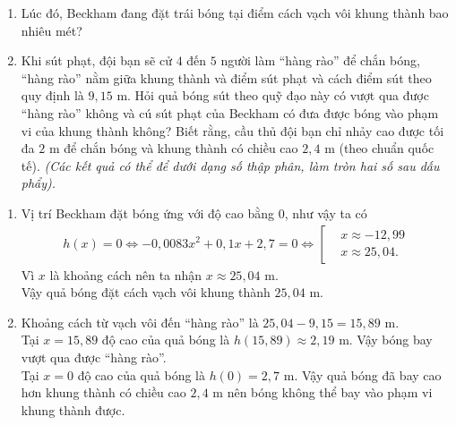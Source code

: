 \begin{bt}
\begin{center}
\begin{tikzpicture}[>=stealth]
  \end{tikzpicture}
 \end{center}
 \begin{enumerate}
  \item Lúc đó, Beckham đang đặt trái bóng tại điểm cách vạch vôi khung thành bao nhiêu mét?
  \item Khi sút phạt, đội bạn sẽ cử $4$ đến $5$ người làm ``hàng rào'' để chắn bóng, ``hàng rào'' nằm giữa khung thành và điểm sút phạt và cách điểm sút theo quy định là $9{,}15$ m. Hỏi quả bóng sút theo quỹ đạo này có vượt qua được ``hàng rào'' không và cú sút phạt của Beckham có đưa được bóng vào phạm vi của khung thành không? Biết rằng, cầu thủ đội bạn chỉ nhảy cao được tối đa $2$ m để chắn bóng và khung thành có chiều cao $2{,}4$ m (theo chuẩn quốc tế). \textit{(Các kết quả có thể để dưới dạng số thập phân, làm tròn hai số sau dấu phẩy).}
 \end{enumerate}
 \loigiai
  {
  \begin{enumerate}
   \item Vị trí Beckham đặt bóng ứng với độ cao bằng $0$, như vậy ta có
   \begin{eqnarray*}
    h(x)=0 \Leftrightarrow -0{,}0083x^2+0{,}1x+2{,}7=0 \Leftrightarrow\left[\begin{aligned}&x\approx -12{,}99 \\&x\approx 25{,}04.\end{aligned}\right.
   \end{eqnarray*}
   Vì $x$ là khoảng cách nên ta nhận $x\approx 25{,}04$ m.\\
   Vậy quả bóng đặt cách vạch vôi khung thành $25{,}04$ m.
   \item Khoảng cách từ vạch vôi đến ``hàng rào'' là $25{,}04-9{,15}=15{,}89$ m.\\
   Tại $x=15{,}89$ độ cao của quả bóng là $h(15{,}89)\approx 2{,}19$ m. Vậy bóng bay vượt qua được ``hàng rào''.\\
   Tại $x=0$ độ cao của quả bóng là $h(0)=2{,}7$ m. Vậy quả bóng đã bay cao hơn khung thành có chiều cao $2{,}4$ m nên bóng không thể bay vào phạm vi khung thành được.
  \end{enumerate}
  }
\end{bt}

